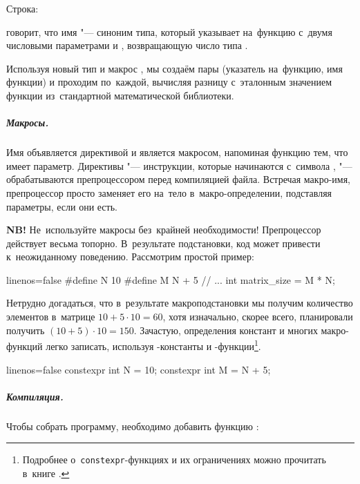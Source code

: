 \noindent Строка:

\noindent говорит, что имя  "--- синоним типа, который указывает на~функцию с~двумя числовыми параметрами  и , возвращающую число типа .

Используя новый тип  и макрос , мы создаём пары (указатель на~функцию, имя функции) и проходим по~каждой, вычисляя разницу с~эталонным значением функции  из~стандартной математической библиотеки.



\subparagraph{Макросы.}
Имя  объявляется директивой  и является макросом, напоминая функцию тем, что имеет параметр. Директивы "--- инструкции, которые начинаются с~символа \code{\#}, "--- обрабатываются препроцессором перед компиляцией файла. Встречая макро-имя, препроцессор просто заменяет его на~тело в~макро-определении, подставляя параметры, если они есть.

\textbf{NB!} Не~используйте макросы без~крайней необходимости! Препроцессор действует весьма топорно. В~результате подстановки, код может привести к~неожиданному поведению. Рассмотрим простой пример:

\begin{cppcode*}{linenos=false}
#define N 10
#define M N + 5
// ...
int matrix_size = M * N;
\end{cppcode*}

\noindent Нетрудно догадаться, что в~результате макроподстановки мы получим количество элементов в~матрице \(10 + 5\cdot 10 = 60\), хотя изначально, скорее всего, планировали получить \((10 + 5)\cdot 10 = 150\). Зачастую, определения констант и многих макро-функций легко записать, используя -константы и -функции\footnote{Подробнее о~\texttt{constexpr}-функциях и их ограничениях можно прочитать в~книге \cite{Meyers:2016:ru, Stroustrup:2013:en}.}.
\enlargethispage{1\baselineskip}

\begin{cppcode*}{linenos=false}
constexpr int N = 10;
constexpr int M = N + 5;
\end{cppcode*}



\subparagraph{Компиляция.}
Чтобы собрать программу, необходимо добавить функцию :

